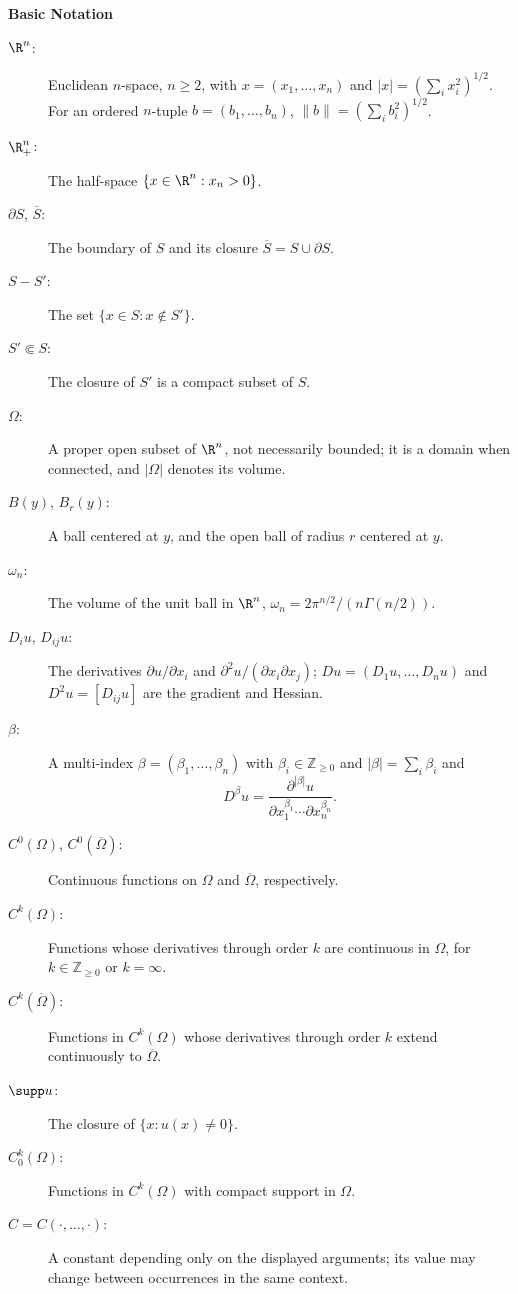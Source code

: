 \begin{notation}\label{gt.not.basic-notation}
\noindent\textbf{Basic Notation}

\begin{description}
\item[$\R^n$:] Euclidean $n$-space, $n\geq2$, with
$x=(x_1,\dots,x_n)$ and
$|x|=(\sum_i x_i^2)^{1/2}$. For an ordered $n$-tuple
$b=(b_1,\dots,b_n)$, $\|b\|=(\sum_i b_i^2)^{1/2}$.
\item[$\R^n_+$:] The half-space $\{x\in\R^n:x_n>0\}$.
\item[$\partial S$, $\overline S$:] The boundary of $S$ and its closure
$\overline S=S\cup\partial S$.
\item[$S-S'$:] The set $\{x\in S:x\notin S'\}$.
\item[$S'\Subset S$:] The closure of $S'$ is a compact subset of $S$.
\item[$\Omega$:] A proper open subset of $\R^n$, not necessarily bounded; it is
a domain when connected, and $|\Omega|$ denotes its volume.
\item[$B(y)$, $B_r(y)$:] A ball centered at $y$, and the open ball of radius
$r$ centered at $y$.
\item[$\omega_n$:] The volume of the unit ball in $\R^n$,
$\omega_n=2\pi^{n/2}/(n\Gamma(n/2))$.
\item[$D_i u$, $D_{ij}u$:] The derivatives
$\partial u/\partial x_i$ and
$\partial^2u/(\partial x_i\partial x_j)$; $Du=(D_1u,\dots,D_nu)$ and
$D^2u=[D_{ij}u]$ are the gradient and Hessian.
\item[$\beta$:] A multi-index
$\beta=(\beta_1,\dots,\beta_n)$ with $\beta_i\in\mathbb Z_{\geq0}$ and
$|\beta|=\sum_i\beta_i$ and
\[
D^\beta u=
\frac{\partial^{|\beta|}u}
{\partial x_1^{\beta_1}\cdots\partial x_n^{\beta_n}}.
\]
\item[$C^0(\Omega)$, $C^0(\overline\Omega)$:] Continuous functions on
$\Omega$ and $\overline\Omega$, respectively.
\item[$C^k(\Omega)$:] Functions whose derivatives through order $k$ are
continuous in $\Omega$, for $k\in\mathbb Z_{\geq0}$ or $k=\infty$.
\item[$C^k(\overline\Omega)$:] Functions in $C^k(\Omega)$ whose derivatives
through order $k$ extend continuously to $\overline\Omega$.
\item[$\supp u$:] The closure of $\{x:u(x)\neq0\}$.
\item[$C_0^k(\Omega)$:] Functions in $C^k(\Omega)$ with compact support in
$\Omega$.
\item[$C=C(\cdot,\dots,\cdot)$:] A constant depending only on the displayed
arguments; its value may change between occurrences in the same context.
\end{description}
\end{notation}
